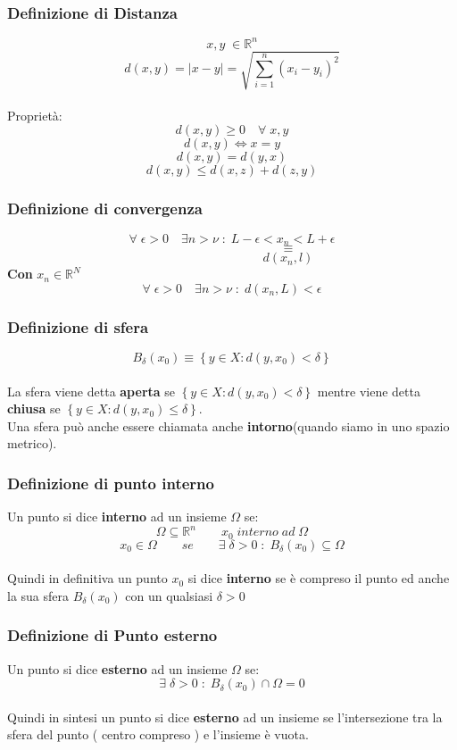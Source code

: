 \documentclass[fontsize = 20px, paper = a4]{article}
\begin{document}
\subsubsection{Definizione di Distanza}
\hspace*{1cm}
$$x,y \; \in \mathbb{R}^n$$
$$d(x,y) = |x-y| = \sqrt{\sum_{i = 1}^{n}(x_i - y_i)^2} $$ \\ 
Proprietà:
$$d(x,y) \ge 0 \quad \forall \; x,y$$
$$d(x,y) \Leftrightarrow x = y$$
$$d(x,y) = d(y,x) $$
$$d(x,y) \le d(x,z) + d(z,y)$$
\subsubsection{Definizione di convergenza}
\hspace*{1cm}
$$\forall \; \epsilon > 0 \quad \exists n > \nu \; : \; L - \epsilon < x_n < L+\epsilon$$
$$\quad\quad\quad\quad\quad\quad\quad\quad\quad \equiv$$
$$\quad\quad\quad\quad\quad\quad\quad\quad\quad d(x_n,l)$$
\textbf{Con} $x_n \in \mathbb{R}^N$
$$\forall \; \epsilon > 0 \quad \exists n > \nu \; : \; d(x_n,L) < \epsilon$$
 
\subsubsection{Definizione di sfera}
\hspace*{1cm}
$$B_\delta \left(x_0 \right) \equiv \left\{ y\in X : d \left( y,x_0\right )  < \delta  \right\}$$  \\
La sfera viene detta \textbf{aperta} se $\left\{ y\in X : d \left( y,x_0\right )  < \delta \right\}$ mentre viene detta \textbf{chiusa} se $\left\{ y\in X : d \left( y,x_0  \right ) \le \delta \right\}$.\\
Una sfera può anche essere  chiamata anche \textbf{intorno}(quando siamo in uno spazio metrico).
\subsubsection{Definizione di punto interno}
Un punto si dice \textbf{interno} ad un insieme $\Omega$ se: \\
$$\Omega \subseteq \mathbb{R}^n \qquad x_0 \; interno \; ad \; \Omega$$
$$x_0 \in \Omega \qquad se \qquad \exists \; \delta > 0 \; : \; B_\delta(x_0) \subseteq \Omega$$ \\
Quindi in definitiva un punto $x_0$ si dice \textbf{interno} se è compreso il punto ed anche la sua sfera $B_\delta(x_0)$ con un qualsiasi $\delta > 0$
\subsubsection{Definizione di Punto esterno}
Un punto si dice \textbf{esterno} ad un insieme $\Omega $ se:
$$\exists \; \delta > 0 \; : \;  B_\delta(x_0) \cap \Omega = 0$$ \\
Quindi in sintesi un punto si dice \textbf{esterno} ad un insieme se l'intersezione tra la sfera del punto ( centro compreso ) e l'insieme è vuota.
\end{document}
